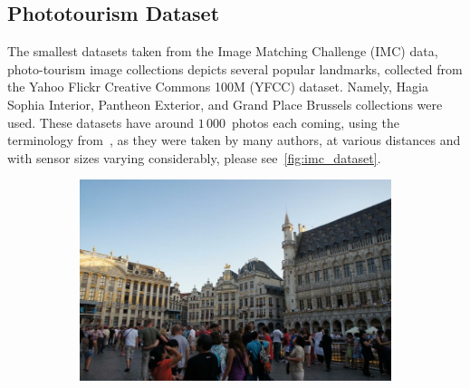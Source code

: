 \subsection{Phototourism Dataset}

The smallest datasets taken from the Image Matching Challenge (IMC) data, photo-tourism image
collections depicts several popular landmarks, collected from the Yahoo Flickr Creative
Commons 100M (YFCC) dataset. Namely, Hagia Sophia Interior, Pantheon Exterior, and Grand
Place Brussels collections were used. These datasets have around $1\,000$~photos each
coming, using the terminology from~\citet{NRIW},  as they were taken by
many authors, at various distances and with sensor sizes varying considerably, please
see~\cref{fig:imc_dataset}.

\begin{figure}
	\centering
	\begin{subfigure}{.5\textwidth}
		\centering
		\includegraphics[width=.9\textwidth]{../graphics/grand_06498281_8296173847.jpg}
	\end{subfigure}%
	\begin{subfigure}{.5\textwidth}
		\centering

\end{subfigure}
\end{figure}
